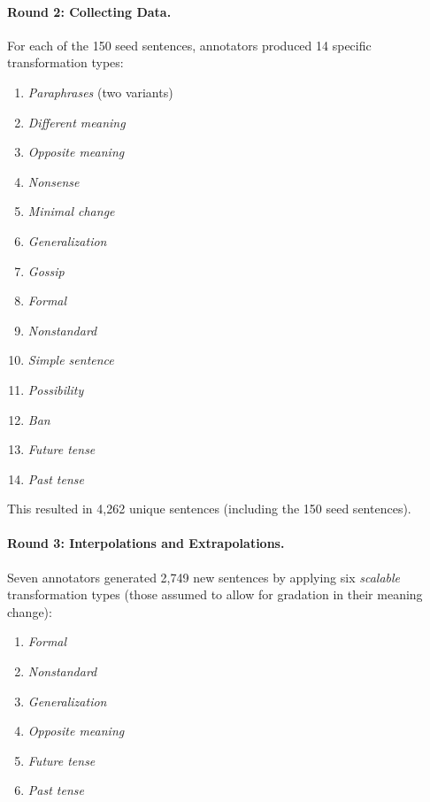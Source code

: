 \paragraph{Round 2: Collecting Data.}  
For each of the 150 seed sentences, annotators produced 14 specific transformation types:
\begin{enumerate}
\setlength{\itemsep}{0.2em}
\setlength{\parskip}{0pt}
\setlength{\parsep}{0pt}
    \item \emph{Paraphrases} (two variants)
    \item \emph{Different meaning} 
    \item \emph{Opposite meaning}
    \item \emph{Nonsense} 
    \item \emph{Minimal change}
    \item \emph{Generalization}
    \item \emph{Gossip}
    \item \emph{Formal}
    \item \emph{Nonstandard}
    \item \emph{Simple sentence}
    \item \emph{Possibility}
    \item \emph{Ban}
    \item \emph{Future tense}
    \item \emph{Past tense}
\end{enumerate}

This resulted in 4{,}262 unique sentences (including the 150 seed sentences).

\paragraph{Round 3: Interpolations and Extrapolations.}  
Seven annotators generated 2{,}749 new sentences by applying six \textit{scalable} transformation types (those assumed to allow for gradation in their meaning change):
\begin{enumerate}
\setlength{\itemsep}{0.2em}
\setlength{\parskip}{0pt}
\setlength{\parsep}{0pt}
    \item \emph{Formal}
    \item \emph{Nonstandard}
    \item \emph{Generalization}
    \item \emph{Opposite meaning}
    \item \emph{Future tense}
    \item \emph{Past tense}
\end{enumerate}

